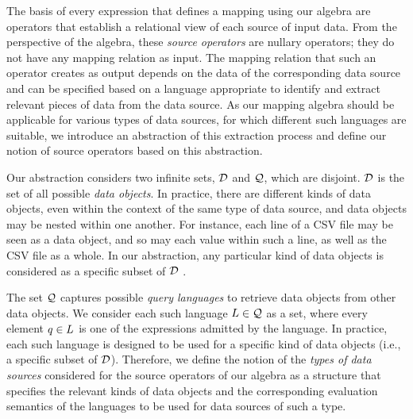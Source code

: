 The basis of every expression that defines a mapping using our algebra are
operators that establish a relational view of each source of input data. 
From the perspective of the algebra, these \emph{source operators} are nullary
operators; they do not have any mapping relation as input. 
The mapping relation that such an operator creates as output depends on the
data of the corresponding data source and can be specified based on a language
appropriate to identify and extract relevant pieces of data from the data
source. 
As our mapping algebra should be applicable for various types of data sources,
for which different such languages are suitable, we introduce an abstraction of
this extraction process and define our notion of source operators based on this
abstraction.

Our abstraction considers
two infinite sets, $\mathcal{D}$ and $\mathcal{Q}$, which are disjoint.
$\mathcal{D}$ is the set of all possible \emph{data objects}.
In practice,
there are different kinds of data objects, even within the context of the same type of data source, and data objects may be nested within one another. For instance,
each line of a CSV file may be seen as a data object, and so may each value within such a line, as well as the CSV file as a whole.
In our abstraction, any particular kind of data objects is considered as a specific subset of $\mathcal{D}$%
.


The set $\mathcal{Q}$ captures possible \emph{query languages} to retrieve data objects from other data objects. We consider each such language $L \in \mathcal{Q}$ as a set, where every element $q \in L$ is one of the expressions
admitted by
the language. In practice, each such language is designed to be used for a specific kind of data objects (i.e., a specific subset of $\mathcal{D}$).
Therefore, we define the notion of the \emph{types of data sources} considered for the source operators of our algebra as a structure that specifies the relevant kinds of data objects and the corresponding evaluation semantics of the languages to be used for data sources of such a type.


